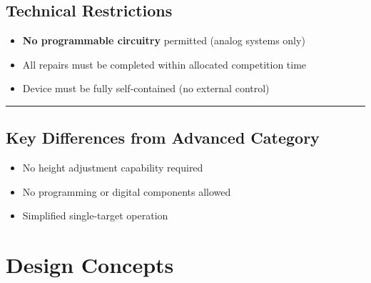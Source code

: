 \documentclass{article}
\begin{document}
\subsection{Technical Restrictions}
\begin{itemize}[itemsep=-0.7mm,topsep=0pt]
	\item \textbf{No programmable circuitry} permitted (analog systems only)
	\item All repairs must be completed within allocated competition time
	\item Device must be fully self-contained (no external control)
\end{itemize}
\vspace{1em}\hrule\vspace{0.5em}
\subsection*{Key Differences from Advanced Category}
\begin{itemize}[itemsep=-0.7mm]
	\item No height adjustment capability required
	\item No programming or digital components allowed
	\item Simplified single-target operation
\end{itemize}


\newpage{}
\section{Design Concepts}
\end{document}

